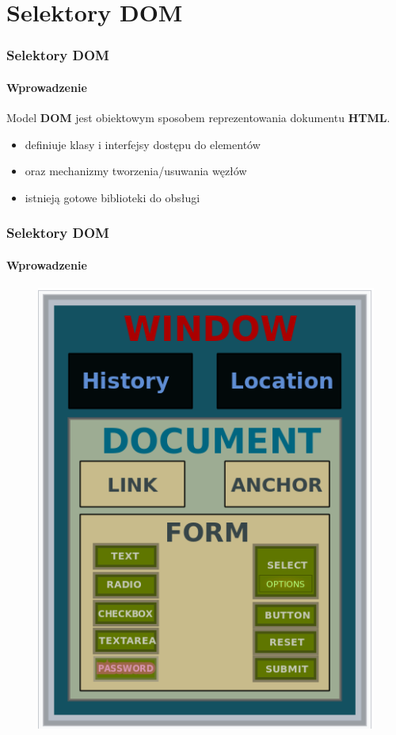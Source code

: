 \section{Selektory DOM}

\begin{frame}[fragile]
  \frametitle{Selektory DOM}
  \framesubtitle{Wprowadzenie}

  Model \textbf{DOM} jest obiektowym sposobem reprezentowania dokumentu \textbf{HTML}.

  \begin{itemize}
    \item definiuje klasy i interfejsy dostępu do elementów
    \item oraz mechanizmy tworzenia/usuwania węzłów
    \item istnieją gotowe biblioteki do obsługi
  \end{itemize}

\end{frame}

\begin{frame}[fragile]
  \frametitle{Selektory DOM}
  \framesubtitle{Wprowadzenie}

  \begin{figure}
    \includegraphics[scale=0.45]{images/dom-structure}
  \end{figure}

\end{frame}

